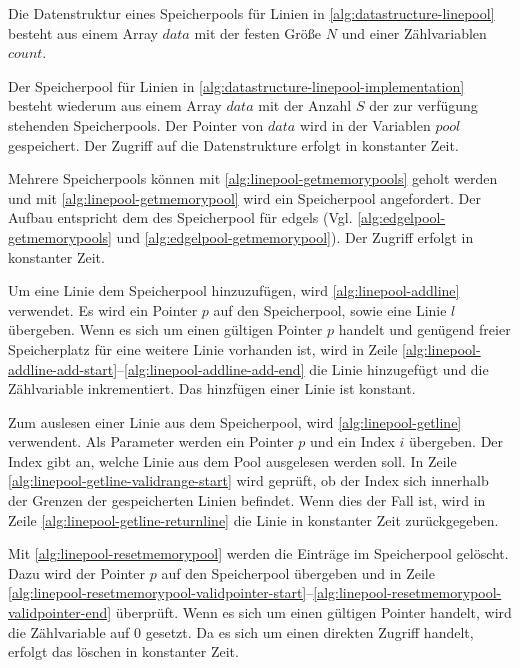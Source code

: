 

Die Datenstruktur eines Speicherpools für Linien in \autoref{alg:datastructure-linepool} besteht aus einem Array
 $\mathit{data}$ mit der festen Größe $N$ und einer Zählvariablen $\mathit{count}$.



Der Speicherpool für Linien in \autoref{alg:datastructure-linepool-implementation} besteht wiederum aus einem Array
 $\mathit{data}$ mit der Anzahl $S$ der zur verfügung stehenden Speicherpools. Der Pointer von $\mathit{data}$ wird in
 der Variablen $\mathit{pool}$ gespeichert. Der Zugriff auf die Datenstrukture erfolgt in konstanter Zeit.

Mehrere Speicherpools können mit \autoref{alg:linepool-getmemorypools} geholt werden und mit
 \autoref{alg:linepool-getmemorypool} wird ein Speicherpool angefordert. Der Aufbau entspricht dem des Speicherpool für
 \gls{edgels} (Vgl. \autoref{alg:edgelpool-getmemorypools} und \autoref{alg:edgelpool-getmemorypool}). Der Zugriff
 erfolgt in konstanter Zeit.





Um eine Linie dem Speicherpool hinzuzufügen, wird \autoref{alg:linepool-addline} verwendet. Es wird ein Pointer $p$ auf
 den Speicherpool, sowie eine Linie $l$ übergeben. Wenn es sich um einen gültigen Pointer $p$ handelt und genügend
 freier Speicherplatz für eine weitere Linie vorhanden ist, wird in Zeile
 \ref{alg:linepool-addline-add-start}--\ref{alg:linepool-addline-add-end} die Linie hinzugefügt und die Zählvariable
 inkrementiert. Das hinzfügen einer Linie ist konstant.



Zum auslesen einer Linie aus dem Speicherpool, wird \autoref{alg:linepool-getline} verwendent. Als Parameter werden ein
 Pointer $p$ und ein Index $i$ übergeben. Der Index gibt an, welche Linie aus dem Pool ausgelesen werden soll. In Zeile
 \ref{alg:linepool-getline-validrange-start} wird geprüft, ob der Index sich innerhalb der Grenzen der gespeicherten
 Linien befindet. Wenn dies der Fall ist, wird in Zeile \ref{alg:linepool-getline-returnline} die Linie in konstanter
 Zeit zurückgegeben.



Mit \autoref{alg:linepool-resetmemorypool} werden die Einträge im Speicherpool gelöscht. Dazu wird der Pointer $p$ auf
 den Speicherpool übergeben und in Zeile
 \ref{alg:linepool-resetmemorypool-validpointer-start}--\ref{alg:linepool-resetmemorypool-validpointer-end} überprüft.
 Wenn es sich um einen gültigen Pointer handelt, wird die Zählvariable auf $0$ gesetzt. Da es sich um einen direkten
 Zugriff handelt, erfolgt das löschen in konstanter Zeit.

